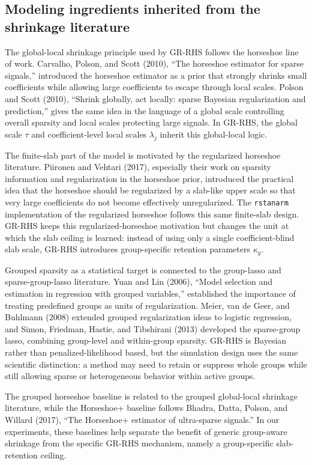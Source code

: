 \documentclass[11pt]{article}
\begin{document}
\subsection{Modeling ingredients inherited from the shrinkage literature}

The global-local shrinkage principle used by GR-RHS follows the horseshoe
line of work. Carvalho, Polson, and Scott (2010), ``The horseshoe estimator for
sparse signals,'' introduced the horseshoe estimator as a prior that strongly
shrinks small coefficients while allowing large coefficients to escape through
local scales. Polson and Scott (2010), ``Shrink globally, act locally: sparse
Bayesian regularization and prediction,'' gives the same idea in the language
of a global scale controlling overall sparsity and local scales protecting
large signals. In GR-RHS, the global scale \(\tau\) and coefficient-level local
scales \(\lambda_j\) inherit this global-local logic.

The finite-slab part of the model is motivated by the regularized horseshoe
literature. Piironen and Vehtari (2017), especially their work on sparsity
information and regularization in the horseshoe prior, introduced the practical
idea that the horseshoe should be regularized by a slab-like upper scale so
that very large coefficients do not become effectively unregularized. The
\texttt{rstanarm} implementation of the regularized horseshoe follows this
same finite-slab design. GR-RHS keeps this regularized-horseshoe motivation but
changes the unit at which the slab ceiling is learned: instead of using only a
single coefficient-blind slab scale, GR-RHS introduces group-specific retention
parameters \(\kappa_g\).

Grouped sparsity as a statistical target is connected to the group-lasso and
sparse-group-lasso literature. Yuan and Lin (2006), ``Model selection and
estimation in regression with grouped variables,'' established the importance
of treating predefined groups as units of regularization. Meier, van de Geer,
and Buhlmann (2008) extended grouped regularization ideas to logistic
regression, and Simon, Friedman, Hastie, and Tibshirani (2013) developed the
sparse-group lasso, combining group-level and within-group sparsity. GR-RHS is
Bayesian rather than penalized-likelihood based, but the simulation design uses
the same scientific distinction: a method may need to retain or suppress whole
groups while still allowing sparse or heterogeneous behavior within active
groups.

The grouped horseshoe baseline is related to the grouped global-local
shrinkage literature, while the Horseshoe+ baseline follows Bhadra, Datta,
Polson, and Willard (2017), ``The Horseshoe+ estimator of ultra-sparse
signals.'' In our experiments, these baselines help separate the benefit of
generic group-aware shrinkage from the specific GR-RHS mechanism, namely a
group-specific slab-retention ceiling.
\end{document}

